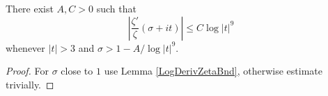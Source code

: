 \begin{lemma}[LogDerivZetaBndUnif99]
\label{LogDerivZetaBndUnif99}
\leanok
There exist $A, C > 0$ such that
  $$|\frac{\zeta'}{\zeta}(\sigma + it)|\leq C \log |t|^9$$
  whenever $|t|>3$ and $\sigma > 1 - A/\log |t|^9$.
\end{lemma}
\begin{proof}
\leanok
For $\sigma$ close to $1$ use Lemma \ref{LogDerivZetaBnd}, otherwise estimate trivially.
\end{proof}
